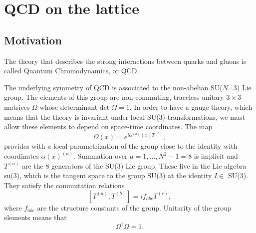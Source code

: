 \chapter{QCD on the lattice}


\label{ch_foundation}


\section{Motivation}
\label{ch_foundation:sec:general}

The theory that describes the strong interactions between quarks and gluons is called Quantum Chromodynamics, or QCD. 

The underlying symmetry of QCD is associated to the non-abelian SU($N$=3) Lie group. The elements of this group are non-commuting, traceless unitary $3 \times 3$ matrices $\Omega$ whose determinant $\textrm{det}\;\Omega=1$. In order to have a gauge theory, which means that the theory is invariant under local SU(3) transformations, we must allow these elements to depend on space-time coordinates. The map
\begin{equation}
\Omega(x)=e^{i\alpha^{(a)}(x)T^{(a)}},
\end{equation}
provides with a local parametrization of the group close to the identity with coordinates $\alpha(x)^{(a)}$. Summation over $a=1,...,N^2-1=8$ is implicit and $T^{(a)}$ are the 8 generators of the SU(3) Lie group. These live in the Lie algebra su(3), which is the tangent space to the group SU(3) at the identity $I\in$ SU(3). They satisfy the commutation relations
\begin{equation}
\left[T^{(a)}, T^{(b)}\right]=if_{abc}T^{(c)},
\end{equation}
where $f_{abc}$ are the structure constants of the group. Unitarity of the group elements means that
\begin{equation}
\Omega^{\dagger}\Omega=1.
\end{equation}

